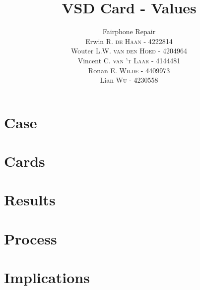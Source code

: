 \documentclass[final]{scrartcl} %
\title{VSD Card - Values}
\author{Fairphone Repair \\
Erwin R. \textsc{de Haan} - 4222814\\
Wouter L.W. \textsc{van den Hoed} - 4204964 \\
Vincent C. \textsc{van 't Laar} - 4144481 \\
Ronan E. \textsc{Wilde} - 4409973 \\
Lian \textsc{Wu} - 4230558 \\}
\begin{document}
\maketitle
\section{Case}
\section{Cards}
\section{Results}
\section{Process}
\section{Implications}

\printbibliography
\end{document}
